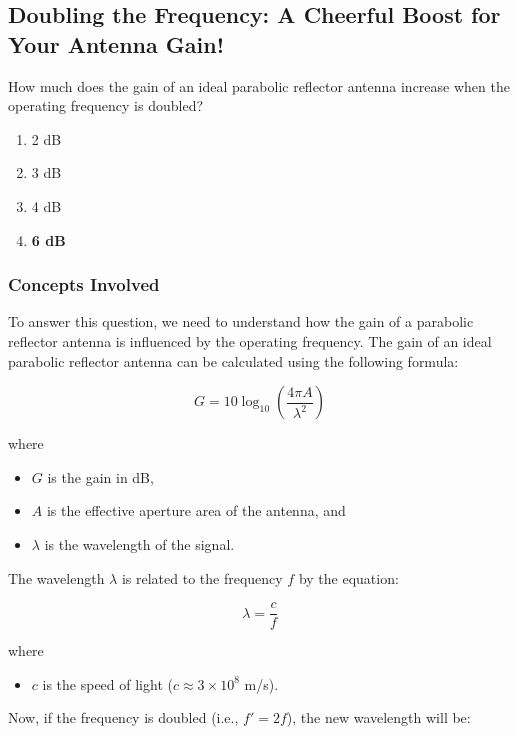 \subsection{Doubling the Frequency: A Cheerful Boost for Your Antenna Gain!}

\begin{tcolorbox}[colback=gray!10, colframe=black, title=E9D01]  
How much does the gain of an ideal parabolic reflector antenna increase when the operating frequency is doubled?

\begin{enumerate}[label=\Alph*]
    \item 2 dB
    \item 3 dB
    \item 4 dB
    \item \textbf{6 dB}
\end{enumerate} \end{tcolorbox}

\subsubsection{Concepts Involved}

To answer this question, we need to understand how the gain of a parabolic reflector antenna is influenced by the operating frequency. The gain of an ideal parabolic reflector antenna can be calculated using the following formula:

\[
G = 10 \log_{10} \left( \frac{4 \pi A}{\lambda^2} \right)
\]

where 
\begin{itemize}
    \item \( G \) is the gain in dB,
    \item \( A \) is the effective aperture area of the antenna, and 
    \item \( \lambda \) is the wavelength of the signal.
\end{itemize}

The wavelength \( \lambda \) is related to the frequency \( f \) by the equation:

\[
\lambda = \frac{c}{f}
\]

where 
\begin{itemize}
    \item \( c \) is the speed of light (\( c \approx 3 \times 10^8 \) m/s).
\end{itemize}

Now, if the frequency is doubled (i.e., \( f' = 2f \)), the new wavelength will be:

